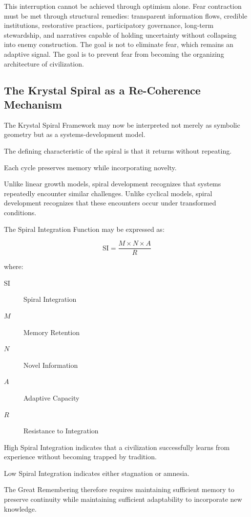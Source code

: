 \documentclass[12pt]{article}
\begin{document}
This interruption cannot be achieved through optimism alone. Fear contraction must be met through structural remedies: transparent information flows, credible institutions, restorative practices, participatory governance, long-term stewardship, and narratives capable of holding uncertainty without collapsing into enemy construction. The goal is not to eliminate fear, which remains an adaptive signal. The goal is to prevent fear from becoming the organizing architecture of civilization.

\subsection{The Krystal Spiral as a Re-Coherence Mechanism}

The Krystal Spiral Framework may now be interpreted not merely as symbolic geometry but as a systems-development model.

The defining characteristic of the spiral is that it returns without repeating.

Each cycle preserves memory while incorporating novelty.

Unlike linear growth models, spiral development recognizes that systems repeatedly encounter similar challenges. Unlike cyclical models, spiral development recognizes that these encounters occur under transformed conditions.

The Spiral Integration Function may be expressed as:

\[
\mathrm{SI}=\frac{M\times N\times A}{R}
\]

where:

\begin{description}
  \item[\(\mathrm{SI}\)] Spiral Integration
  \item[\(M\)] Memory Retention
  \item[\(N\)] Novel Information
  \item[\(A\)] Adaptive Capacity
  \item[\(R\)] Resistance to Integration
\end{description}

High Spiral Integration indicates that a civilization successfully learns from experience without becoming trapped by tradition.

Low Spiral Integration indicates either stagnation or amnesia.

The Great Remembering therefore requires maintaining sufficient memory to preserve continuity while maintaining sufficient adaptability to incorporate new knowledge.
\end{document}
